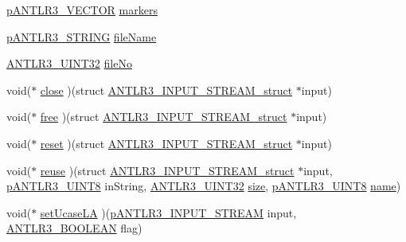 \begin{DoxyCompactItemize}
\item 
\hyperlink{antlr3interfaces_8h_a0dfeeada7529fbe1b968be84079b828f}{p\-A\-N\-T\-L\-R3\-\_\-\-V\-E\-C\-T\-O\-R} \hyperlink{struct_a_n_t_l_r3___i_n_p_u_t___s_t_r_e_a_m__struct_a2994637c93652f92a9b8b1d3090f5eb9}{markers}
\item 
\hyperlink{antlr3interfaces_8h_a36bbe7362079348864db4b4dbdcce56b}{p\-A\-N\-T\-L\-R3\-\_\-\-S\-T\-R\-I\-N\-G} \hyperlink{struct_a_n_t_l_r3___i_n_p_u_t___s_t_r_e_a_m__struct_abc54ce78713d5c52e306752257932454}{file\-Name}
\item 
\hyperlink{antlr3defs_8h_ac41f744abd0fd25144b9eb9d11b1dfd1}{A\-N\-T\-L\-R3\-\_\-\-U\-I\-N\-T32} \hyperlink{struct_a_n_t_l_r3___i_n_p_u_t___s_t_r_e_a_m__struct_af3a29ce19ec2349bf234303390890b28}{file\-No}
\item 
void($\ast$ \hyperlink{struct_a_n_t_l_r3___i_n_p_u_t___s_t_r_e_a_m__struct_a1174c85bc9399c19072476c3187eec25}{close} )(struct \hyperlink{struct_a_n_t_l_r3___i_n_p_u_t___s_t_r_e_a_m__struct}{A\-N\-T\-L\-R3\-\_\-\-I\-N\-P\-U\-T\-\_\-\-S\-T\-R\-E\-A\-M\-\_\-struct} $\ast$input)
\item 
void($\ast$ \hyperlink{struct_a_n_t_l_r3___i_n_p_u_t___s_t_r_e_a_m__struct_a942654996b465ef576470e0beb0519ab}{free} )(struct \hyperlink{struct_a_n_t_l_r3___i_n_p_u_t___s_t_r_e_a_m__struct}{A\-N\-T\-L\-R3\-\_\-\-I\-N\-P\-U\-T\-\_\-\-S\-T\-R\-E\-A\-M\-\_\-struct} $\ast$input)
\item 
void($\ast$ \hyperlink{struct_a_n_t_l_r3___i_n_p_u_t___s_t_r_e_a_m__struct_ac4698064b0b32eddb47f954d1c664071}{reset} )(struct \hyperlink{struct_a_n_t_l_r3___i_n_p_u_t___s_t_r_e_a_m__struct}{A\-N\-T\-L\-R3\-\_\-\-I\-N\-P\-U\-T\-\_\-\-S\-T\-R\-E\-A\-M\-\_\-struct} $\ast$input)
\item 
void($\ast$ \hyperlink{struct_a_n_t_l_r3___i_n_p_u_t___s_t_r_e_a_m__struct_af0d68334a6d2d6c73a1f32fd7c579682}{reuse} )(struct \hyperlink{struct_a_n_t_l_r3___i_n_p_u_t___s_t_r_e_a_m__struct}{A\-N\-T\-L\-R3\-\_\-\-I\-N\-P\-U\-T\-\_\-\-S\-T\-R\-E\-A\-M\-\_\-struct} $\ast$input, \hyperlink{antlr3defs_8h_a95c800abcac5d607fd9e3e775ace78c5}{p\-A\-N\-T\-L\-R3\-\_\-\-U\-I\-N\-T8} in\-String, \hyperlink{antlr3defs_8h_ac41f744abd0fd25144b9eb9d11b1dfd1}{A\-N\-T\-L\-R3\-\_\-\-U\-I\-N\-T32} \hyperlink{struct_a_n_t_l_r3___i_n_p_u_t___s_t_r_e_a_m__struct_a52014f7dacdfa801db4c20a24a08f5b7}{size}, \hyperlink{antlr3defs_8h_a95c800abcac5d607fd9e3e775ace78c5}{p\-A\-N\-T\-L\-R3\-\_\-\-U\-I\-N\-T8} \hyperlink{qmb_8m_abdc1dcc6fed70c14f9b5ae237e486f4e}{name})
\item 
void($\ast$ \hyperlink{struct_a_n_t_l_r3___i_n_p_u_t___s_t_r_e_a_m__struct_a7dfb77fa3d12dd66d9ea9bfe38c890a4}{set\-Ucase\-L\-A} )(\hyperlink{antlr3interfaces_8h_a30a8f71f3e04066360723d538fd67f16}{p\-A\-N\-T\-L\-R3\-\_\-\-I\-N\-P\-U\-T\-\_\-\-S\-T\-R\-E\-A\-M} input, \hyperlink{antlr3defs_8h_a5b33dccbba3b7212539695e21df4079b}{A\-N\-T\-L\-R3\-\_\-\-B\-O\-O\-L\-E\-A\-N} flag)

\end{DoxyCompactItemize}
